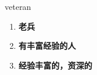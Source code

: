 
\begin{frame}
{\huge veteran}
\begin{center}
\begin{enumerate}\Large
  \item \textbf{老兵}
  \item \textbf{有丰富经验的人}
  \item \textbf{经验丰富的，资深的}
\end{enumerate}
\end{center}
\end{frame}
